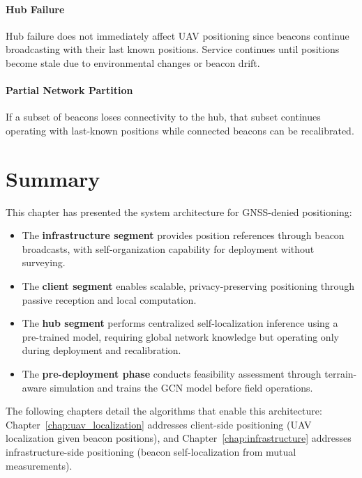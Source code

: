 \documentclass[master,final,11pt]{iscs-thesis}
\begin{document}
\paragraph{Hub Failure}
Hub failure does not immediately affect UAV positioning since beacons continue broadcasting with their last known positions.
Service continues until positions become stale due to environmental changes or beacon drift.

\paragraph{Partial Network Partition}
If a subset of beacons loses connectivity to the hub, that subset continues operating with last-known positions while connected beacons can be recalibrated.

\section{Summary}
\label{sec:architecture_summary}

This chapter has presented the system architecture for GNSS-denied positioning:

\begin{itemize}
    \item The \textbf{infrastructure segment} provides position references through beacon broadcasts, with self-organization capability for deployment without surveying.
    
    \item The \textbf{client segment} enables scalable, privacy-preserving positioning through passive reception and local computation.
    
    \item The \textbf{hub segment} performs centralized self-localization inference using a pre-trained model, requiring global network knowledge but operating only during deployment and recalibration.
    
    \item The \textbf{pre-deployment phase} conducts feasibility assessment through terrain-aware simulation and trains the GCN model before field operations.
\end{itemize}

The following chapters detail the algorithms that enable this architecture: Chapter~\ref{chap:uav_localization} addresses client-side positioning (UAV localization given beacon positions), and Chapter~\ref{chap:infrastructure} addresses infrastructure-side positioning (beacon self-localization from mutual measurements).
\end{document}
